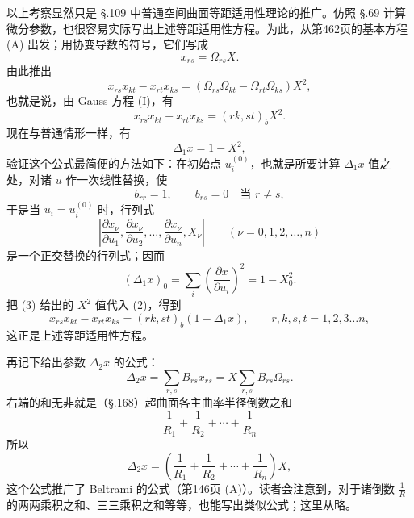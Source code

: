 以上考察显然只是 \S.109 中普通空间曲面等距适用性理论的推广。仿照 \S.69 计算微分参数，也很容易实际写出上述等距适用性方程。为此，从第462页的基本方程 (A) 出发；用协变导数的符号，它们写成
\[
x_{rs}=\Omega_{rs}X.
\]
由此推出
\[
x_{rs}x_{kt}-x_{rt}x_{ks}=(\Omega_{rs}\Omega_{kt}-\Omega_{rt}\Omega_{ks})X^2,
\]
也就是说，由 Gauss 方程 (I)，有
\[
\tag{2}
x_{rs}x_{kt}-x_{rt}x_{ks}=(rk,st)_bX^2.
\]
现在与普通情形一样，有
\[
\tag{3}
\Delta_1 x=1-X^2,
\]
验证这个公式最简便的方法如下：在初始点 $u_i^{(0)}$，也就是所要计算 $\Delta_1x$ 值之处，对诸 $u$ 作一次线性替换，使
\[
b_{rr}=1,\qquad b_{rs}=0\quad \text{当 }r\ne s,
\]
于是当 $u_i=u_i^{(0)}$ 时，行列式
\[
\left|\frac{\partial x_\nu}{\partial u_1},\frac{\partial x_\nu}{\partial u_2},\ldots,
\frac{\partial x_\nu}{\partial u_n},X_\nu\right|
\qquad (\nu=0,1,2,\ldots,n)
\]
是一个正交替换的行列式；因而
\[
(\Delta_1x)_0=\sum_i\left(\frac{\partial x}{\partial u_i}\right)^2=1-X_0^2.
\]
把 (3) 给出的 $X^2$ 值代入 (2)，得到
\[
\tag{III}
x_{rs}x_{kt}-x_{rt}x_{ks}=(rk,st)_b(1-\Delta_1x),
\qquad r,k,s,t=1,2,3\ldots n,
\]
这正是上述等距适用性方程。

再记下给出参数 $\Delta_2x$ 的公式：
\[
\Delta_2x=\sum_{r,s}B_{rs}x_{rs}=X\sum_{r,s}B_{rs}\Omega_{rs}.
\]
右端的和无非就是（\S.168）超曲面各主曲率半径倒数之和
\[
\frac1{R_1}+\frac1{R_2}+\cdots+\frac1{R_n}
\]
所以
\[
\tag{4}
\Delta_2x=\left(\frac1{R_1}+\frac1{R_2}+\cdots+\frac1{R_n}\right)X,
\]
这个公式推广了 Beltrami 的公式（第146页 (A)）。读者会注意到，对于诸倒数 $\frac1R$ 的两两乘积之和、三三乘积之和等等，也能写出类似公式；这里从略。

